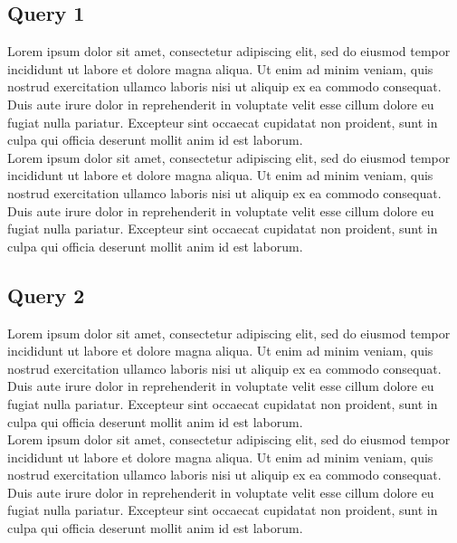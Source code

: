 \documentclass{sig-alternate-05-2015}
\begin{document}
\subsection{Query 1}
Lorem ipsum dolor sit amet, consectetur adipiscing elit, sed do eiusmod tempor incididunt ut labore et dolore magna aliqua.
Ut enim ad minim veniam, quis nostrud exercitation ullamco laboris nisi ut aliquip ex ea commodo consequat.
Duis aute irure dolor in reprehenderit in voluptate velit esse cillum dolore eu fugiat nulla pariatur.
Excepteur sint occaecat cupidatat non proident, sunt in culpa qui officia deserunt mollit anim id est laborum.
\\
Lorem ipsum dolor sit amet, consectetur adipiscing elit, sed do eiusmod tempor incididunt ut labore et dolore magna aliqua.
Ut enim ad minim veniam, quis nostrud exercitation ullamco laboris nisi ut aliquip ex ea commodo consequat.
Duis aute irure dolor in reprehenderit in voluptate velit esse cillum dolore eu fugiat nulla pariatur.
Excepteur sint occaecat cupidatat non proident, sunt in culpa qui officia deserunt mollit anim id est laborum.

\subsection{Query 2}
Lorem ipsum dolor sit amet, consectetur adipiscing elit, sed do eiusmod tempor incididunt ut labore et dolore magna aliqua.
Ut enim ad minim veniam, quis nostrud exercitation ullamco laboris nisi ut aliquip ex ea commodo consequat.
Duis aute irure dolor in reprehenderit in voluptate velit esse cillum dolore eu fugiat nulla pariatur.
Excepteur sint occaecat cupidatat non proident, sunt in culpa qui officia deserunt mollit anim id est laborum.
\\
Lorem ipsum dolor sit amet, consectetur adipiscing elit, sed do eiusmod tempor incididunt ut labore et dolore magna aliqua.
Ut enim ad minim veniam, quis nostrud exercitation ullamco laboris nisi ut aliquip ex ea commodo consequat.
Duis aute irure dolor in reprehenderit in voluptate velit esse cillum dolore eu fugiat nulla pariatur.
Excepteur sint occaecat cupidatat non proident, sunt in culpa qui officia deserunt mollit anim id est laborum.
\end{document}
